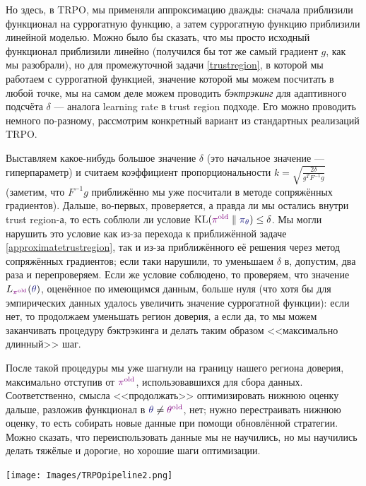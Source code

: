 Но здесь, в TRPO, мы применяли аппроксимацию дважды: сначала приблизили функционал на суррогатную функцию, а затем суррогатную функцию приблизили линейной моделью. Можно было бы сказать, что мы просто исходный функционал приблизили линейно (получился бы тот же самый градиент $g$, как мы разобрали), но для промежуточной задачи \eqref{trustregion}, в которой мы работаем с суррогатной функцией, значение которой мы можем посчитать в любой точке, мы на самом деле можем проводить \emph{бэктрэкинг} для адаптивного подсчёта $\delta$ --- аналога learning rate в trust region подходе. Его можно проводить немного по-разному, рассмотрим конкретный вариант из стандартных реализаций TRPO.

Выставляем какое-нибудь большое значение $\delta$ (это начальное значение --- гиперпараметр) и считаем коэффициент пропорциональности $k = \sqrt{\frac{2 \delta}{g^TF^{-1}g}}$ (заметим, что $F^{-1}g$ приближённо мы уже посчитали в методе сопряжённых градиентов). Дальше, во-первых, проверяется, а правда ли мы остались внутри trust region-а, то есть соблюли ли условие $\KL(\textcolor{ChadPurple}{\pi^{\old}} \parallel \textcolor{ChadBlue}{\pi_\theta}) \HM\le \delta$. Мы могли нарушить это условие как из-за перехода к приближённой задаче \eqref{approximatetrustregion}, так и из-за приближённого её решения через метод сопряжённых градиентов; если таки нарушили, то уменьшаем $\delta$ в, допустим, два раза и перепроверяем. Если же условие соблюдено, то проверяем, что значение $L_{\textcolor{ChadPurple}{\pi^{\old}}}(\textcolor{ChadBlue}{\theta})$, оценённое по имеющимся данным, больше нуля (что хотя бы для эмпирических данных удалось увеличить значение суррогатной функции): если нет, то продолжаем уменьшать регион доверия, а если да, то мы можем заканчивать процедуру бэктрэкинга и делать таким образом <<максимально длинный>> шаг.

После такой процедуры мы уже шагнули на границу нашего региона доверия, максимально отступив от $\textcolor{ChadPurple}{\pi^{\old}}$, использовавшихся для сбора данных. Соответственно, смысла <<продолжать>> оптимизировать нижнюю оценку дальше, разложив функционал в $\textcolor{ChadBlue}{\theta} \ne \textcolor{ChadPurple}{\theta^{\old}}$, нет; нужно перестраивать нижнюю оценку, то есть собирать новые данные при помощи обновлённой стратегии. Можно сказать, что переиспользовать данные мы не научились, но мы научились делать тяжёлые и дорогие, но хорошие шаги оптимизации. 

\vspace{0.4cm}
\begin{center}
\texttt{[image: Images/TRPOpipeline2.png]}
\end{center}

